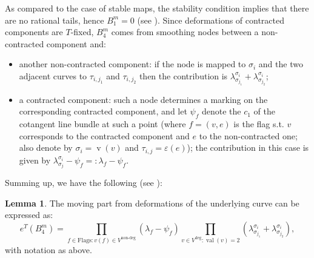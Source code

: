\documentclass[11pt]{amsart}
\newcommand{\val}{\operatorname{val}}
\newcommand{\vv}{\operatorname{v}}
\theoremstyle{definition}
\newtheorem{lem}[thm]{Lemma}
\theoremstyle{definition}
\begin{document}
As compared to the case of stable maps, the stability condition implies that there are no rational tails, hence $B_1^m=0$ (see \cite[Lemma 7.2]{HolgerSpielberg}). Since deformations of contracted components are $T$-fixed, $B_4^m$ comes from smoothing nodes between a non-contracted component and:
\begin{itemize}
 \item another non-contracted component: if the node is mapped to $\sigma_i$ and the two adjacent curves to $\tau_{i,j_1}$ and $\tau_{i,j_2}$ then the contribution is $\lambda^{\sigma_i}_{\sigma_{j_1}}+\lambda^{\sigma_i}_{\sigma_{j_2}}$;
 \item a contracted component: such a node determines a marking on the corresponding contracted component, and let $\psi_f$ denote the $c_1$ of the cotangent line bundle at such a point (where $f=(v,e)$ is the flag s.t. $v$ corresponds to the contracted component and $e$ to the non-contracted one; also denote by $\sigma_i=\vv(v)$ and $\tau_{i,j}=\varepsilon(e)$); the contribution in this case is given by $\lambda^{\sigma_i}_{\sigma_j}-\psi_f=:\lambda_f-\psi_f$.
\end{itemize}
Summing up, we have the following (see \cite[Lemma 7.3]{HolgerSpielberg}):
\begin{lem}
 The moving part from deformations of the underlying curve can be expressed as:
 \[
  e^T(B_4^m)=\prod_{f\in\text{Flags}\colon v(f)\in V^{\text{non-deg}}}(\lambda_f-\psi_f)\prod_{v\in V^\text{deg}\colon\val(v)=2}(\lambda^{\sigma_i}_{\sigma_{j_1}}+\lambda^{\sigma_i}_{\sigma_{j_2}}),
 \]
 with notation as above.
\end{lem}
\end{document}
